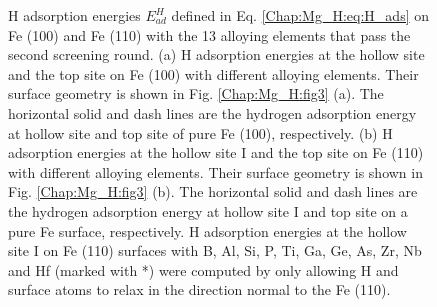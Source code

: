 \newpage
\begingroup
\begin{figure}[!ht]
  \centering
  \label{Chap:Mg_H:fig:8a}
  \label{Chap:Mg_H:fig:8b}
\caption[H adsorption energies on Fe (100) and Fe (110) with the 13 alloying elements that pass the second screening round]{H adsorption energies $E_{ad}^H$ defined in Eq. \ref{Chap:Mg_H:eq:H_ads} on Fe (100) and Fe (110) with the 13 alloying elements that pass the second screening round.  (a) H adsorption energies at the hollow site and the top site on Fe (100) with different alloying elements. Their surface geometry is shown in Fig. \ref{Chap:Mg_H:fig3} (a). The horizontal solid and dash lines are the hydrogen adsorption energy at hollow site and top site of pure Fe (100), respectively. (b) H adsorption energies at the hollow site I and the top site on Fe (110) with different alloying elements. Their surface geometry is shown in Fig. \ref{Chap:Mg_H:fig3} (b). The horizontal solid and dash lines are the hydrogen adsorption energy at hollow site I and top site on a pure Fe surface, respectively. H adsorption energies at the hollow site I on Fe (110) surfaces with B, Al, Si, P, Ti, Ga, Ge, As, Zr, Nb and Hf (marked with *) were computed by only allowing H and surface atoms to relax in the direction normal to the Fe (110).}
  \label{Chap:Mg_H:fig8}
\end{figure}
\endgroup